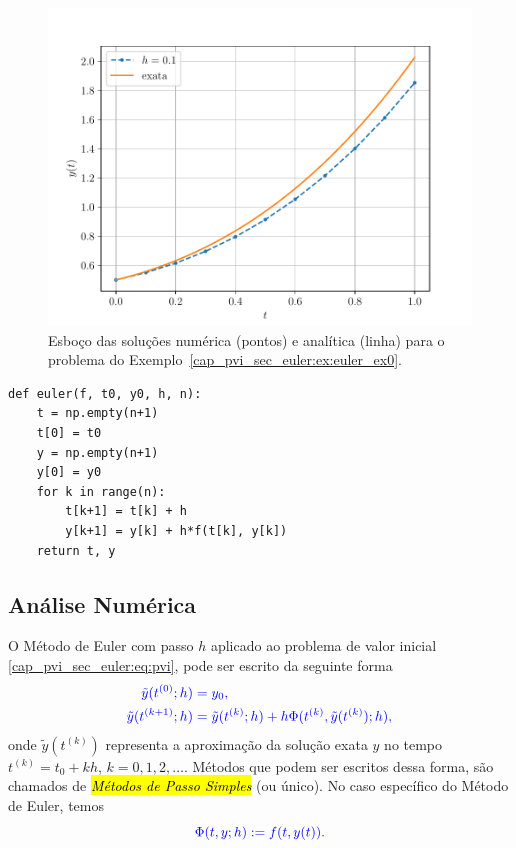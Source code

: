 \begin{ex}
\begin{figure}[H]
  \centering
  \includegraphics[width=\textwidth]{./cap_pvi/dados/fig_euler_ex0/fig}
  \caption{Esboço das soluções numérica (pontos) e analítica (linha) para o problema do Exemplo~\ref{cap_pvi_sec_euler:ex:euler_ex0}.}
  \label{fig:ex_Euler_1}
\end{figure}
\end{ex}

\begin{lstlisting}[caption=euler.py, label=cap_pvi_sec_euler:cod:euler]
def euler(f, t0, y0, h, n):
    t = np.empty(n+1)
    t[0] = t0
    y = np.empty(n+1)
    y[0] = y0
    for k in range(n):
        t[k+1] = t[k] + h
        y[k+1] = y[k] + h*f(t[k], y[k])
    return t, y
\end{lstlisting}

\subsection{Análise Numérica}

O Método de Euler com passo $h$ aplicado ao problema de valor inicial \eqref{cap_pvi_sec_euler:eq:pvi}, pode ser escrito da seguinte forma
\begin{subequations}\label{cap_pvi_sec_euler:eq:mps}\hleq
  \begin{align}
    \tilde{y}(t^{(0)}; h) &= y_0,\\
    \tilde{y}(t^{(k+1)}; h) &= \tilde{y}(t^{(k)}; h) + h\Phi(t^{(k)}, \tilde{y}(t^{(k)}); h),
  \end{align}
\end{subequations}
onde $\tilde{y}(t^{(k)})$ representa a aproximação da solução exata $y$ no tempo $t^{(k)}=t_0+ kh$, $k=0, 1, 2, \ldots$. Métodos que podem ser escritos dessa forma, são chamados de \hl{\emph{Métodos de Passo Simples}} (ou único). No caso específico do Método de Euler, temos
\begin{equation}\color{blue}\Phi(t, y; h) := f(t, y(t)).
\end{equation}

